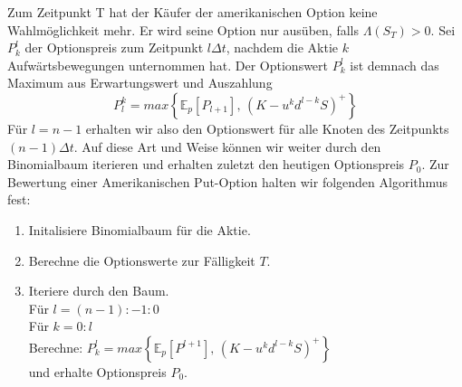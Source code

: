 Zum Zeitpunkt T hat der Käufer der amerikanischen Option keine Wahlmöglichkeit mehr. Er wird seine Option nur ausüben, falls $\Lambda(S_T) > 0$. Sei $P^l_k$ der Optionspreis zum Zeitpunkt $l\Delta t$, nachdem die Aktie $k$ Aufwärtsbewegungen unternommen hat. Der Optionswert $P^l_k$ ist demnach das Maximum aus Erwartungswert und Auszahlung
\begin{equation}
P^{k}_l = max\left\{\mathbb{E}_p\left[P_{l+1}\right],\,\left(K-u^kd^{l-k}S\right)^+\right\} \label{BIN:AmMax}
\end{equation}
Für $l = n-1$ erhalten wir also den Optionswert für alle Knoten des Zeitpunkts $(n-1)\Delta t$. Auf diese Art und Weise können wir weiter durch den Binomialbaum iterieren und erhalten zuletzt den heutigen Optionspreis $P_0$.
Zur Bewertung einer Amerikanischen Put-Option halten wir folgenden Algorithmus fest:
\begin{center}
\begin{enumerate}
\item Initalisiere Binomialbaum für die Aktie.
\item Berechne die Optionswerte zur Fälligkeit $T$.
\item Iteriere durch den Baum. \\
   \hspace{1cm} Für $l = (n-1):-1:0$ \\
   \hspace{2cm} Für $k = 0:l$ \\
   \hspace{3cm} Berechne: $P^{l}_k = max\left\{\mathbb{E}_p\left[P^{l+1}\right],\,\left(K-u^kd^{l-k}S\right)^+\right\}$\\
   und erhalte Optionspreis $P_0$.
\end{enumerate}
\end{center}

